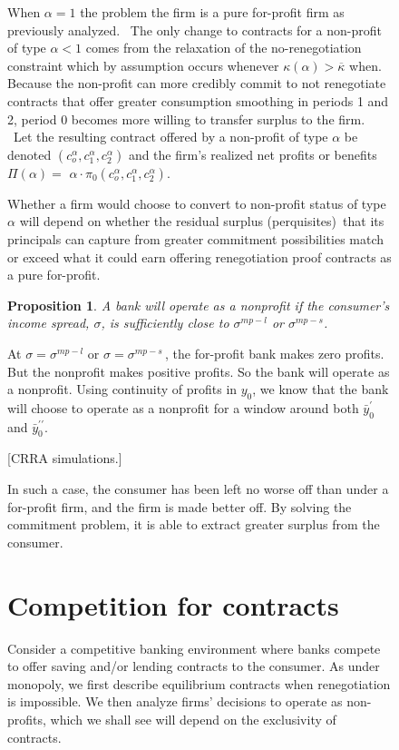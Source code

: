 \documentclass[11pt]{article}%
\newtheorem{proposition}{Proposition}
\begin{document}
\begin{figure}
{When $\alpha=1$ the problem the firm is a pure for-profit firm as previously
analyzed. \ The only change to contracts for a non-profit of type $\alpha<1$
comes from the relaxation of the no-renegotiation constraint which by
assumption occurs whenever $\kappa(\alpha)>\overline{\kappa}$ when. Because
the non-profit can more credibly commit to not renegotiate contracts that
offer greater consumption smoothing in periods 1 and 2, period 0 becomes more
willing to transfer surplus to the firm. \ Let the resulting contract offered
by a non-profit of type $\alpha$ be denoted $\left(  c_{o}^{\alpha}%
,c_{1}^{\alpha},c_{2}^{\alpha}\right)  $ and the firm's realized net profits
or benefits $\Pi(\alpha)=$ $\alpha\cdot\pi_{0}\left(  c_{o}^{\alpha}%
,c_{1}^{\alpha},c_{2}^{\alpha}\right)  .$

Whether a firm would choose to convert to non-profit status of type $\alpha$
will depend on whether the residual surplus (perquisites)\ that its principals
can capture from greater commitment possibilities match or exceed what it
could earn offering renegotiation proof contracts as a pure for-profit.

\begin{proposition}
A bank will operate as a nonprofit if the consumer's income spread, $\sigma$,
is sufficiently close to $\sigma^{mp-l}$ or $\sigma^{mp-s}$.
\end{proposition}

At $\sigma=\sigma^{mp-l}$ or $\sigma=\sigma^{mp-s}\,$, the for-profit bank
makes zero profits. But the nonprofit makes positive profits. So the bank will
operate as a nonprofit. Using continuity of profits in $y_{0}$, we know that
the bank will choose to operate as a nonprofit for a window around both
$\bar{y}_{0}^{\prime}$ and $\bar{y}_{0}^{\prime\prime}$.

[CRRA simulations.]

In such a case, the consumer has been left no worse off than under a
for-profit firm, and the firm is made better off. By solving the commitment
problem, it is able to extract greater surplus from the consumer.

\section{Competition for contracts}

Consider a competitive banking environment where banks compete to offer
saving and/or lending contracts to the consumer.  As under monopoly, we first describe equilibrium contracts when
renegotiation is impossible. We then analyze firms' decisions to operate as
non-profits, which we shall see will depend on the exclusivity of contracts.




}
\end{figure}
\end{document}
